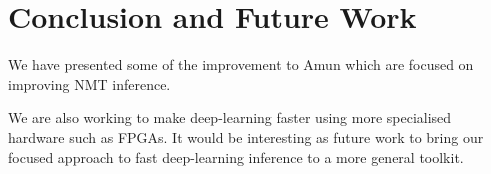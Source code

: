 \documentclass[11pt,a4paper]{article}
\begin{document}
\section{Conclusion and Future Work}

We have presented some of the improvement to Amun which are focused on improving NMT inference.

We are also working to make deep-learning faster using more specialised hardware such as FPGAs. It would be interesting as future work to bring our focused approach to fast deep-learning inference to a more general toolkit. 




\end{document}
